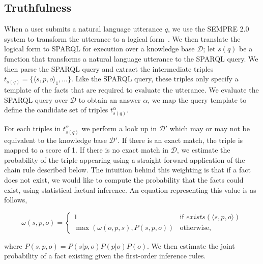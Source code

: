 

\subsection{Truthfulness}
\label{sec:probqa-interface}

When a user submits a natural language utterance \(q\), we use the SEMPRE 2.0 system to transform the utterance to a logical form~\cite{berant2013freebase,berant2013semantic}.
We then translate the logical form to SPARQL for execution over a knowledge base \(\mathcal{D}\);
let \(s(q)\) be a function that transforms a natural language utterance to the SPARQL query.
We then parse the SPARQL query and extract the intermediate triples \( t_{s(q)} = \{\langle s,p,o\rangle_1, \ldots \}\). 
Like the SPARQL query, these triples only specify a template of the facts that are required to evaluate the utterance.
We evaluate the SPARQL query over \(\mathcal{D}\) to obtain an answer \( \alpha \), we map the query template to define the candidate set of triples \( t^\alpha_{s(q)} \).

For each triples in \( t^\alpha_{s(q)} \) we perform a look up in \(\mathcal{D'}\) which may or may not be equivalent to the knowledge base \(\mathcal{D'}\).
If there is an exact match, the triple is mapped to a score of 1.
If there is no exact match in \(\mathcal{D}\), we estimate the probability of
the triple appearing using a straight-forward application of the chain rule
described below.
The intuition behind this weighting is that if a fact does not exist, we would
like to compute the probability that the facts could exist, using statistical
factual inference.
An equation representing this value is as follows,

\begin{equation}
  \label{eq:probqa-weight}
  \omega(s,p,o) = \begin{cases}
    1 & \mbox{if } exists(\langle s,p,o \rangle) \\ 
    \max( \omega(o,p,s), P(s,p,o)) & \mbox{otherwise,}
  \end{cases}
\end{equation}

where \( P(s,p,o) = P(s|p,o)  P(p|o)  P(o) \).
We then estimate the joint probability of a fact existing given the first-order
inference rules.


